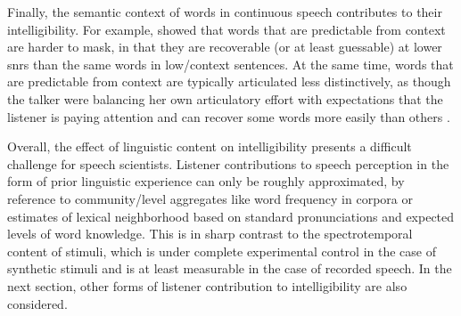 Finally, the semantic context of words in continuous speech contributes to their intelligibility.  For example, \citet{LewisEtAl1988} showed that words that are predictable from context are harder to mask, in that they are recoverable (or at least guessable) at lower \ac{snr}s than the same words in low\-/context sentences.  At the same time, words that are predictable from context are typically articulated less distinctively, as though the talker were balancing her own articulatory effort with expectations that the listener is paying attention and can recover some words more easily than others \citep{Lindblom1990, Wright2004a}.

Overall, the effect of linguistic content on intelligibility presents a difficult challenge for speech scientists.  Listener contributions to speech perception in the form of prior linguistic experience can only be roughly approximated, by reference to community\-/level aggregates like word frequency in corpora or estimates of lexical neighborhood based on standard pronunciations and expected levels of word knowledge.  This is in sharp contrast to the spectrotemporal content of stimuli, which is under complete experimental control in the case of synthetic stimuli and is at least measurable in the case of recorded speech.  In the next section, other forms of listener contribution to intelligibility are also considered.


